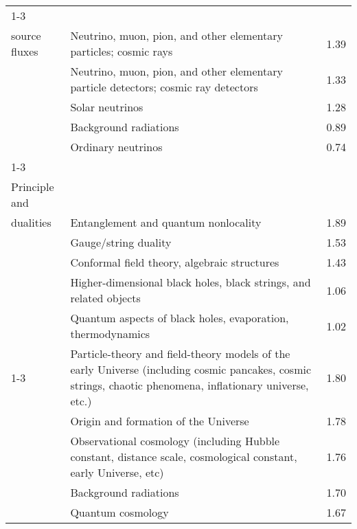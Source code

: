 \begin{longtable}[H]{p{}|p{}|p{}}
\cline{1-3}
\multirow{5}{*}{\begin{tabular}{l}High-energy\\ source fluxes\end{tabular}} & Neutrino, muon, pion, and other elementary particles; cosmic rays &  1.39 \\
                                        & Neutrino, muon, pion, and other elementary particle detectors; cosmic ray detectors &  1.33 \\
                                        & Solar neutrinos &  1.28 \\
                                        & Background radiations &  0.89 \\
                                        & Ordinary neutrinos &  0.74 \\
\cline{1-3}
\multirow{5}{*}{\begin{tabular}{l}Holographic\\ Principle and\\ dualities\end{tabular}} & Entanglement and quantum nonlocality &  1.89 \\
                                        & Gauge/string duality &  1.53 \\
                                        & Conformal field theory, algebraic structures &  1.43 \\
                                        & Higher-dimensional black holes, black strings, and related objects &  1.06 \\
                                        & Quantum aspects of black holes, evaporation, thermodynamics &  1.02 \\
\cline{1-3}
\multirow{5}{*}{\begin{tabular}{l}Inflation\end{tabular}} & Particle-theory and field-theory models of the early Universe (including cosmic pancakes, cosmic strings, chaotic phenomena, inflationary universe, etc.) &  1.80 \\
                                        & Origin and formation of the Universe &  1.78 \\
                                        & Observational cosmology (including Hubble constant, distance scale, cosmological constant, early Universe, etc) &  1.76 \\
                                        & Background radiations &  1.70 \\
                                        & Quantum cosmology &  1.67 \\

\end{longtable}
